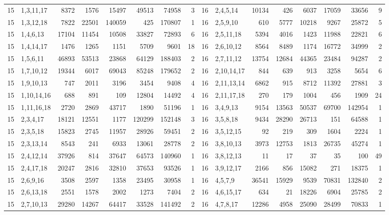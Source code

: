 \begin{table}[tp]
\begin{ruledtabular}
\begin{tabular}{rlrrrrrr@{\hspace{2.2em}}rlrrrrrr}
15 & 1,3,11,17 & 8372 & 1576 & 15497 & 49513 & 74958 & 3 & 16 & 2,4,5,14 & 10134 & 426 & 6037 & 17059 & 33656 & 9 \\
15 & 1,3,12,18 & 7822 & 22501 & 140059 & 425 & 170807 & 1 & 16 & 2,5,9,10 & 610 & 5777 & 10218 & 9267 & 25872 & 5 \\
15 & 1,4,6,13 & 17104 & 11454 & 10508 & 33827 & 72893 & 6 & 16 & 2,5,11,18 & 5394 & 4016 & 1423 & 11988 & 22821 & 6 \\
15 & 1,4,14,17 & 1476 & 1265 & 1151 & 5709 & 9601 & 18 & 16 & 2,6,10,12 & 8564 & 8489 & 1174 & 16772 & 34999 & 2 \\
15 & 1,5,6,11 & 46893 & 53513 & 23868 & 64129 & 188403 & 2 & 16 & 2,7,11,12 & 13754 & 12684 & 44365 & 23484 & 94287 & 2 \\
15 & 1,7,10,12 & 19344 & 6017 & 69043 & 85248 & 179652 & 2 & 16 & 2,10,14,17 & 844 & 639 & 913 & 3258 & 5654 & 6 \\
15 & 1,9,10,13 & 747 & 2011 & 3196 & 3454 & 9408 & 4 & 16 & 2,11,13,14 & 6862 & 915 & 8712 & 11392 & 27881 & 3 \\
15 & 1,10,14,16 & 688 & 891 & 109 & 12804 & 14492 & 4 & 16 & 2,11,17,18 & 270 & 179 & 1004 & 456 & 1909 & 24 \\
15 & 1,11,16,18 & 2720 & 2869 & 43717 & 1890 & 51196 & 1 & 16 & 3,4,9,13 & 9154 & 13563 & 50537 & 69700 & 142954 & 1 \\
15 & 2,3,4,17 & 18121 & 12551 & 1177 & 120299 & 152148 & 3 & 16 & 3,5,8,18 & 9434 & 28290 & 26713 & 151 & 64588 & 1 \\
15 & 2,3,5,18 & 15823 & 2745 & 11957 & 28926 & 59451 & 2 & 16 & 3,5,12,15 & 92 & 219 & 309 & 1604 & 2224 & 1 \\
15 & 2,3,13,14 & 8543 & 241 & 6933 & 13061 & 28778 & 2 & 16 & 3,8,10,13 & 3973 & 12753 & 1813 & 26735 & 45274 & 1 \\
15 & 2,4,12,14 & 37926 & 814 & 37647 & 64573 & 140960 & 1 & 16 & 3,8,12,13 & 11 & 17 & 37 & 35 & 100 & 49 \\
15 & 2,4,17,18 & 20247 & 2816 & 32810 & 37653 & 93526 & 1 & 16 & 3,9,12,17 & 2166 & 856 & 15082 & 271 & 18375 & 1 \\
15 & 2,6,9,16 & 3508 & 2597 & 1358 & 23495 & 30958 & 1 & 16 & 4,5,7,9 & 36541 & 15929 & 9539 & 70831 & 132840 & 2 \\
15 & 2,6,13,18 & 2551 & 1578 & 2002 & 1273 & 7404 & 2 & 16 & 4,6,15,17 & 634 & 21 & 18226 & 6904 & 25785 & 2 \\
15 & 2,7,10,13 & 29280 & 14267 & 64417 & 33528 & 141492 & 2 & 16 & 4,7,8,17 & 12286 & 4958 & 25090 & 28499 & 70833 & 1 \\

\end{tabular}
\end{ruledtabular}
\end{table}
